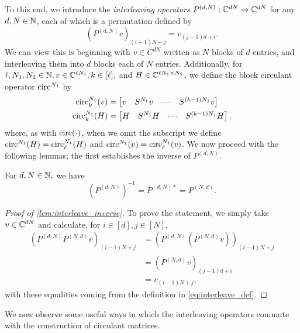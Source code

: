 To this end, we introduce the \emph{interleaving operators} $P^{(d, N)} : \mathbb{C}^{dN} \to \mathbb{C}^{dN}$ for any $d, N \in \mathbb{N}$, each of which is a permutation defined by \begin{equation} (P^{(d, N)} v)_{(i - 1)N + j} = v_{(j - 1)d + i}.\label{eq:interleave_def}\end{equation}  We can view this is beginning with $v \in C^{dN}$ written as $N$ blocks of $d$ entries, and interleaving them into $d$ blocks each of $N$ entries.  Additionally, for $\ell, N_1, N_2 \in \mathbb{N}, v \in \mathbb{C}^{\ell N_1}, k \in [\ell],$ and $H \in \mathbb{C}^{\ell N_1 \times N_2}$, we define the block circulant operator $\operatorname{circ}^{N_1}$ by
\begin{align*}
  \operatorname{circ}_k^{N_1}(v) &= \begin{bmatrix} v & S^{N_1} v & \cdots & S^{(k - 1)N_1} v \end{bmatrix} \\
  \operatorname{circ}_k^{N_1}(H) &= \begin{bmatrix} H & S^{N_1} H & \cdots & S^{(k - 1) N_1}H \end{bmatrix},
\end{align*}
where, as with $\operatorname{circ}(\cdot)$, when we omit the subscript we define $\operatorname{circ}^{N_1}(H) = \operatorname{circ}_\ell^{N_1}(H)$ and $\operatorname{circ}^{N_1}(v) = \operatorname{circ}_\ell^{N_1}(v)$.  We now proceed with the following lemmas; the first establishes the inverse of $P^{(d, N)}$.

\begin{lemma}
  For $d, N \in \mathbb{N},$ we have \[(P^{(d, N)})^{-1} = P^{(d, N) *} = P^{(N, d)}.\]
  \label{lem:interleave_inverse}
\end{lemma}

\begin{proof}[Proof of \cref{lem:interleave_inverse}]
  To prove the statement, we simply take $v \in \mathbb{C}^{d N}$ and calculate, for $i \in [d], j \in [N]$,
  \begin{align*}
    (P^{(d, N)} P^{(N, d)} v)_{(i - 1) N + j} &= (P^{(d, N)} (P^{(N, d)} v))_{(i - 1) N + j} \\
    &= (P^{(N, d)} v)_{(j - 1) d + i} \\
    &= v_{(i - 1) N + j},
  \end{align*}
  with these equalities coming from the definition in \eqref{eq:interleave_def}.  
\end{proof}

We now observe some useful ways in which the interleaving operators commute with the construction of circulant matrices.

